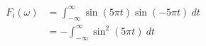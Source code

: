 \documentclass[preview]{standalone}
\begin{document}
\begin{align*}
F_{i}(\omega)&=\int_{-\infty}^{\infty}\sin{(5\pi t)}\sin{(-5\pi t)} \ dt \\ &=-\int_{-\infty}^{\infty}\sin^{2}{(5\pi t)} \ dt
\end{align*}
\end{document}
